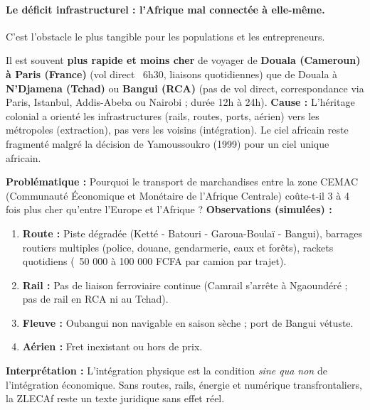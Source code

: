 \documentclass[11pt]{article}
\begin{document}
\paragraph{Le déficit infrastructurel : l'Afrique mal connectée à elle-même.}
C'est l'obstacle le plus tangible pour les populations et les entrepreneurs.

\begin{savaistu}
Il est souvent \textbf{plus rapide et moins cher} de voyager de \textbf{Douala (Cameroun) à Paris (France)} (vol direct ~6h30, liaisons quotidiennes) que de Douala à \textbf{N'Djamena (Tchad)} ou \textbf{Bangui (RCA)} (pas de vol direct, correspondance via Paris, Istanbul, Addis-Abeba ou Nairobi ; durée 12h à 24h).
\textbf{Cause :} L'héritage colonial a orienté les infrastructures (rails, routes, ports, aérien) vers les métropoles (extraction), pas vers les voisins (intégration). Le ciel africain reste fragmenté malgré la décision de Yamoussoukro (1999) pour un ciel unique africain.
\end{savaistu}

\begin{experience}
\textbf{Problématique :} Pourquoi le transport de marchandises entre la zone CEMAC (Communauté Économique et Monétaire de l'Afrique Centrale) coûte-t-il 3 à 4 fois plus cher qu'entre l'Europe et l'Afrique ?
\textbf{Observations (simulées) :}
\begin{enumerate}
    \item \textbf{Route :} Piste dégradée (Ketté - Batouri - Garoua-Boulaï - Bangui), barrages routiers multiples (police, douane, gendarmerie, eaux et forêts), rackets quotidiens (~50 000 à 100 000 FCFA par camion par trajet).
    \item \textbf{Rail :} Pas de liaison ferroviaire continue (Camrail s'arrête à Ngaoundéré ; pas de rail en RCA ni au Tchad).
    \item \textbf{Fleuve :} Oubangui non navigable en saison sèche ; port de Bangui vétuste.
    \item \textbf{Aérien :} Fret inexistant ou hors de prix.
\end{enumerate}
\textbf{Interprétation :} L'intégration physique est la condition \emph{sine qua non} de l'intégration économique. Sans routes, rails, énergie et numérique transfrontaliers, la ZLECAf reste un texte juridique sans effet réel.
\end{experience}
\end{document}
